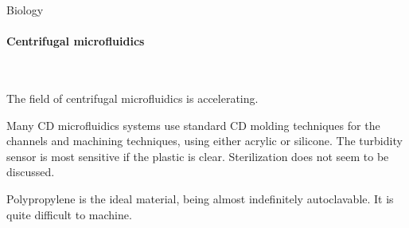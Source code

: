 \documentclass[fleqn,10pt]{article}
\begin{document}
\clearpage
\begin{multicols}{1}
{\Large Biology}\\

\paragraph{\textbf{Centrifugal microfluidics}}\

The field of centrifugal microfluidics is accelerating. 

Many CD microfluidics systems use standard CD molding techniques for the channels and machining techniques, using either acrylic or silicone. The turbidity sensor is most sensitive if the plastic is clear. Sterilization does not seem to be discussed. 

Polypropylene is the ideal material, being almost indefinitely autoclavable. It is quite difficult to machine.

\end{multicols}
\end{document}
